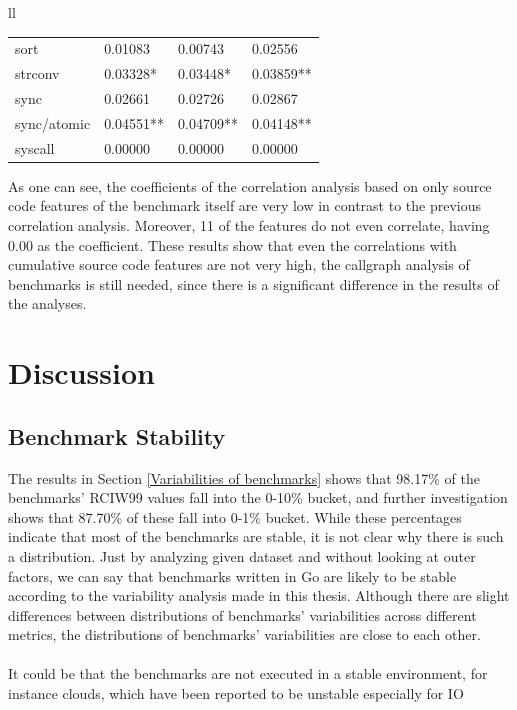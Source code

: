 \documentclass{seal_thesis}
\begin{document}
\begin{table}[H]
\begin{tabular}{ll}
{\begin{tabular}{@{}llll@{}}
		sort & \cellcolor[HTML]{333399}\color{white}0.01083 & \cellcolor[HTML]{333399}\color{white}0.00743 & \cellcolor[HTML]{3366FF}0.02556 \\
		strconv & \cellcolor[HTML]{3366FF}0.03328* & \cellcolor[HTML]{3366FF}0.03448* & \cellcolor[HTML]{3366FF}0.03859** \\
		sync & \cellcolor[HTML]{3366FF}0.02661 & \cellcolor[HTML]{3366FF}0.02726 & \cellcolor[HTML]{3366FF}0.02867 \\
		sync/atomic & \cellcolor[HTML]{3366FF}0.04551** & \cellcolor[HTML]{3366FF}0.04709** & \cellcolor[HTML]{3366FF}0.04148** \\
		syscall & \cellcolor[HTML]{333399}\color{white}0.00000 & \cellcolor[HTML]{333399}\color{white}0.00000 & \cellcolor[HTML]{333399}\color{white}0.00000 \\
		\bottomrule
	\end{tabular}
}
	
\end{tabular}

\end{table}

\noindent As one can see, the coefficients of the correlation analysis based on only source code features of the benchmark itself are very low in contrast to the previous correlation analysis. Moreover, 11 of the features do not even correlate, having 0.00 as the coefficient. These results show that even the correlations with cumulative source code features are not very high, the callgraph analysis of benchmarks is still needed, since there is a significant difference in the results of the analyses.

\chapter{Discussion}
\label{Discussion}


\section{Benchmark Stability}
\label{benchstabilitydiscuss}

The results in Section \ref{Variabilities of benchmarks} shows that 98.17\% of the benchmarks' RCIW99 values fall into the 0-10\% bucket, and further investigation shows that 87.70\% of these fall into 0-1\% bucket. While these percentages indicate that most of the benchmarks are stable, it is not clear why there is such a distribution. Just by analyzing given dataset and without looking at outer factors, we can say that benchmarks written in Go are likely to be stable according to the variability analysis made in this thesis. Although there are slight differences between distributions of benchmarks' variabilities across different metrics, the distributions of benchmarks' variabilities are close to each other.\\
\\
It could be that the benchmarks are not executed in a stable environment, for instance clouds, which have been reported to be unstable especially for IO 
\end{document}
